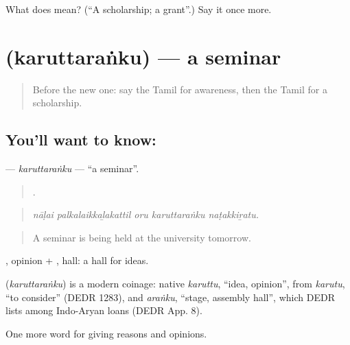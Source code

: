 \begin{tcolorbox}[breakable,colback=teal!4,colframe=teal!35!black,title={Before you move on}]
What does  mean? (\textquotedblleft{}A scholarship; a grant\textquotedblright{}.) Say it once more.
\end{tcolorbox}
\section[\texorpdfstring{\ta{கருத்தரங்கு} (karuttaraṅku)}{கருத்தரங்கு (karuttaraṅku)}]{ (karuttaraṅku) — a seminar}

\label{lesson:TA-C368-karuttaranku}



\begin{quote}
Before the new one: say the Tamil for awareness, then the Tamil for a scholarship.
\end{quote}

\subsection*{You'll want to know: }
\textbf{} — \emph{karuttaraṅku} — \textquotedblleft{}a seminar\textquotedblright{}.

\begin{quote}
    .
\end{quote}

\begin{quote}
\emph{nāḷai palkalaikkaḻakattil oru karuttaraṅku naṭakkiṟatu.}
\end{quote}

\begin{quote}
A seminar is being held at the university tomorrow.
\end{quote}

, opinion + , hall: a hall for ideas.

\begin{cousinweb}
\textbf{} (\emph{karuttaraṅku}) is a modern coinage: native \emph{karuttu}, \textquotedblleft{}idea, opinion\textquotedblright{}, from \emph{karutu}, \textquotedblleft{}to consider\textquotedblright{} (DEDR 1283), and \emph{araṅku}, \textquotedblleft{}stage, assembly hall\textquotedblright{}, which DEDR lists among Indo-Aryan loans (DEDR App. 8).
\end{cousinweb}

\begin{grammarlens}[title={What you've built}]
One more word for giving reasons and opinions.
\end{grammarlens}

